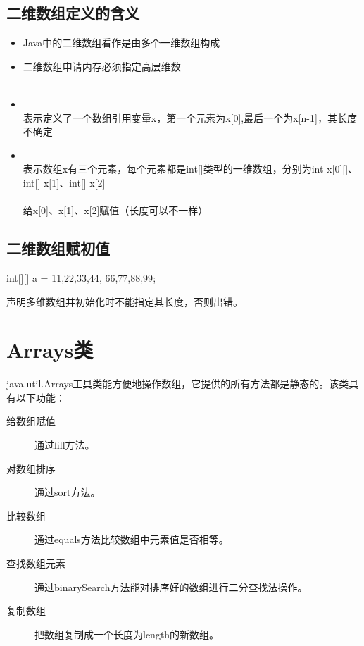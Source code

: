 \subsection{二维数组定义的含义}

\begin{itemize}
\item Java中的二维数组看作是由多个一维数组构成
\item 二维数组申请内存必须指定{\Red 高层维数}\\
  \\
\item {}\\
  {\kai\Blue 表示定义了一个数组引用变量x，第一个元素为x[0],最后一个为x[n-1]，其长度不确定}
\item {}\\
  {\kai\Blue 表示数组x有三个元素，每个元素都是int[]类型的一维数组，分别为int x[0][]、int[] x[1]、int[] x[2]}\\
  \\
  {\kai\Blue 给x[0]、x[1]、x[2]赋值（长度可以不一样）}
\end{itemize}

\subsection{二维数组赋初值}

\begin{javaCode}
  int[][] a = {{11,22,33,44}, {66,77,88,99}};
\end{javaCode}


声明多维数组并初始化时不能指定其长度，否则出错。



\section{Arrays类}

java.util.Arrays工具类能方便地操作数组，它提供的所有方法都是静态的。该类具有以下功能：

\begin{description}
\item[给数组赋值] 通过fill方法。
\item[对数组排序] 通过sort方法。
\item[比较数组] 通过equals方法比较数组中元素值是否相等。
\item[查找数组元素] 通过binarySearch方法能对排序好的数组进行二分查找法操作。
\item[复制数组] 把数组复制成一个长度为length的新数组。
\end{description}

